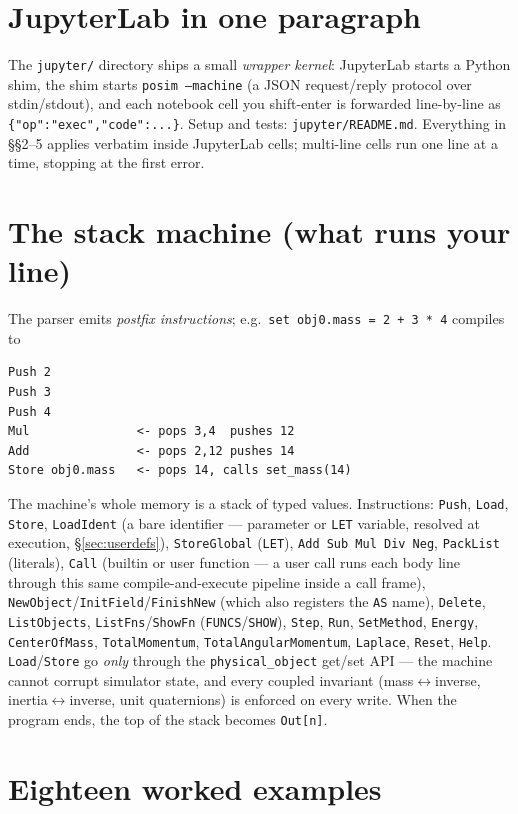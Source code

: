 \documentclass[11pt]{article}
\newcommand{\kw}[1]{\texttt{\uppercase{#1}}}
\newcommand{\code}[1]{\texttt{#1}}
\begin{document}
\section{JupyterLab in one paragraph}\label{sec:jlab}

The \code{jupyter/} directory ships a small \emph{wrapper kernel}:
JupyterLab starts a Python shim, the shim starts \code{posim --machine}
(a JSON request/reply protocol over stdin/stdout), and each notebook
cell you shift-enter is forwarded line-by-line as
\code{\{"op":"exec","code":...\}}. Setup and tests:
\code{jupyter/README.md}. Everything in \S\S2--5 applies verbatim inside
JupyterLab cells; multi-line cells run one line at a time, stopping at
the first error.

\section{The stack machine (what runs your line)}

The parser emits \emph{postfix instructions}; e.g.\
\code{set obj0.mass = 2 + 3 * 4} compiles to
\begin{lstlisting}
Push 2
Push 3
Push 4
Mul               <- pops 3,4  pushes 12
Add               <- pops 2,12 pushes 14
Store obj0.mass   <- pops 14, calls set_mass(14)
\end{lstlisting}
The machine's whole memory is a stack of typed values. Instructions:
\code{Push}, \code{Load}, \code{Store}, \code{LoadIdent} (a bare
identifier --- parameter or \kw{let} variable, resolved at execution,
\S\ref{sec:userdefs}), \code{StoreGlobal} (\kw{let}),
\code{Add Sub Mul Div Neg},
\code{PackList} (literals), \code{Call} (builtin or user function ---
a user call runs each body line through this same compile-and-execute
pipeline inside a call frame),
\code{NewObject}/\code{InitField}/\code{FinishNew} (which also
registers the \kw{as} name), \code{Delete},
\code{ListObjects}, \code{ListFns}/\code{ShowFn}
(\kw{funcs}/\kw{show}), \code{Step}, \code{Run}, \code{SetMethod},
\code{Energy}, \code{CenterOfMass}, \code{TotalMomentum},
\code{TotalAngularMomentum}, \code{Laplace}, \code{Reset}, \code{Help}.
\code{Load}/\code{Store} go \emph{only} through the
\code{physical\_object} get/set API --- the machine cannot corrupt
simulator state, and every coupled invariant (mass$\leftrightarrow$inverse,
inertia$\leftrightarrow$inverse, unit quaternions) is enforced on every
write. When the program ends, the top of the stack becomes \code{Out[n]}.

\section{Eighteen worked examples}
\end{document}
